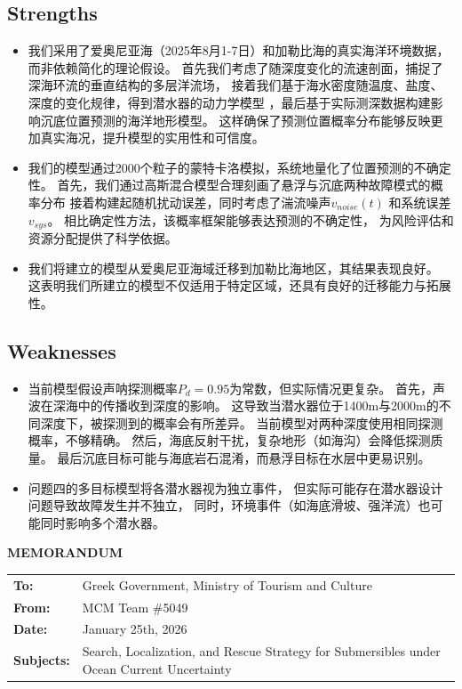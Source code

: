 \documentclass{mcmthesis}
\begin{document}
\subsection{Strengths}
\begin{itemize}
  \item 我们采用了爱奥尼亚海（2025年8月1-7日）和加勒比海的真实海洋环境数据，
而非依赖简化的理论假设。
首先我们考虑了随深度变化的流速剖面，捕捉了深海环流的垂直结构的多层洋流场，
接着我们基于海水密度随温度、盐度、深度的变化规律，得到潜水器的动力学模型
，最后基于实际测深数据构建影响沉底位置预测的海洋地形模型。
这样确保了预测位置概率分布能够反映更加真实海况，提升模型的实用性和可信度。
  \item 我们的模型通过2000个粒子的蒙特卡洛模拟，系统地量化了位置预测的不确定性。
首先，我们通过高斯混合模型合理刻画了悬浮与沉底两种故障模式的概率分布
接着构建起随机扰动误差，同时考虑了湍流噪声$v_{noise}(t)
$ 和系统误差$v_{sys}$。
相比确定性方法，该概率框架能够表达预测的不确定性，
为风险评估和资源分配提供了科学依据。
  \item 我们将建立的模型从爱奥尼亚海域迁移到加勒比海地区，其结果表现良好。
这表明我们所建立的模型不仅适用于特定区域，还具有良好的迁移能力与拓展性。
\end{itemize}
\subsection{Weaknesses}
\begin{itemize}
  \item 当前模型假设声呐探测概率$P_d = 0.95$为常数，但实际情况更复杂。
首先，声波在深海中的传播收到深度的影响。
这导致当潜水器位于1400m与2000m的不同深度下，被探测到的概率会有所差异。
当前模型对两种深度使用相同探测概率，不够精确。
然后，海底反射干扰，复杂地形（如海沟）会降低探测质量。
最后沉底目标可能与海底岩石混淆，而悬浮目标在水层中更易识别。
  \item 问题四的多目标模型将各潜水器视为独立事件，
但实际可能存在潜水器设计问题导致故障发生并不独立，
同时，环境事件（如海底滑坡、强洋流）也可能同时影响多个潜水器。
\end{itemize}
\newpage
{}
\nocite{*} 
  
\appendix
\newpage
{}
\begin{center}
\textbf{\Large MEMORANDUM}
\end{center}

\vspace{0.3cm}
\noindent
\begin{tabular}{@{}ll@{}}
\textbf{To:} & Greek Government, Ministry of Tourism and Culture \\
\textbf{From:} & MCM Team \#5049\\
\textbf{Date:} & January 25th, 2026 \\
\textbf{Subjects:} & Search, Localization, and Rescue Strategy for Submersibles under Ocean Current Uncertainty
\end{tabular}
\end{document}

